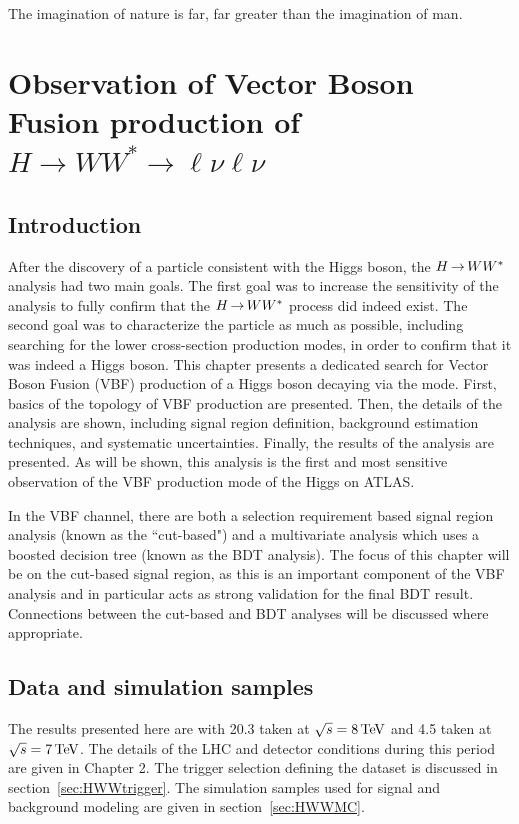 \begin{savequote}[75mm]
The imagination of nature is far, far greater than the imagination of man.
\end{savequote}

\chapter{Observation of Vector Boson Fusion production of $H\rightarrow WW^{*}\rightarrow \ell\nu\ell\nu$}

\section{Introduction}

After the discovery of a particle consistent with the Higgs boson, the $H{\,{\rightarrow}\,}WW^\ast$ analysis had two main goals. The first goal was to increase the sensitivity of the analysis to fully confirm that the $H{\,{\rightarrow}\,}WW^\ast$ process did indeed exist. The second goal was to characterize the particle as much as possible, including searching for the lower cross-section production modes, in order to confirm that it was indeed a Higgs boson.  This chapter presents a dedicated search for Vector Boson Fusion (VBF) production of a Higgs boson decaying via the \HWWfull mode. First, basics of the topology of VBF production are presented. Then, the details of the analysis are shown, including signal region definition, background estimation techniques, and systematic uncertainties. Finally, the results of the analysis are presented. As will be shown, this analysis is the first and most sensitive observation of the VBF production mode of the Higgs on ATLAS.

In the VBF channel, there are both a selection requirement based signal region analysis (known as the ``cut-based") and a multivariate analysis which uses a boosted decision tree (known as the BDT analysis). The focus of this chapter will be on the cut-based signal region, as this is an important component of the VBF analysis and in particular acts as strong validation for the final BDT result. Connections between the cut-based and BDT analyses will be discussed where appropriate. 
 

\section{Data and simulation samples}

The results presented here are with 20.3 \ifb taken at $\sqrt{s} = 8 \TeV$ and 4.5 \ifb taken at $\sqrt{s} = 7 \TeV$. The details of the LHC and detector conditions during this period are given in Chapter 2. The trigger selection defining the dataset is discussed in section~\ref{sec:HWWtrigger}. The simulation samples used for signal and background modeling are given in section~\ref{sec:HWWMC}.

